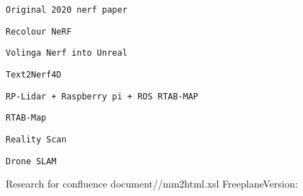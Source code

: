        
       
        \protect\hypertarget{ID_74849492}{}{}

\begin{verbatim}
Original 2020 nerf paper
\end{verbatim}
       

       
       
        \protect\hypertarget{ID_1493427982}{}{}

\begin{verbatim}
Recolour NeRF
\end{verbatim}
       

       
       
        \protect\hypertarget{ID_781514951}{}{}

\begin{verbatim}
Volinga Nerf into Unreal
\end{verbatim}
       

       
       
        \protect\hypertarget{ID_159072040}{}{}

\begin{verbatim}
Text2Nerf4D
\end{verbatim}
       
     

     
     
      \protect\hypertarget{ID_1868010211}{}{}

\begin{verbatim}
RP-Lidar + Raspberry pi + ROS RTAB-MAP
\end{verbatim}

       
       
        \protect\hypertarget{ID_1293686985}{}{}

\begin{verbatim}
RTAB-Map
\end{verbatim}
       
     

     
     
      \protect\hypertarget{ID_1544823716}{}{}

\begin{verbatim}
Reality Scan
\end{verbatim}
     

     
     
      \protect\hypertarget{ID_880033062}{}{}

\begin{verbatim}
Drone SLAM
\end{verbatim}
     
   
 

Research for confluence document//mm2html.xsl FreeplaneVersion:
